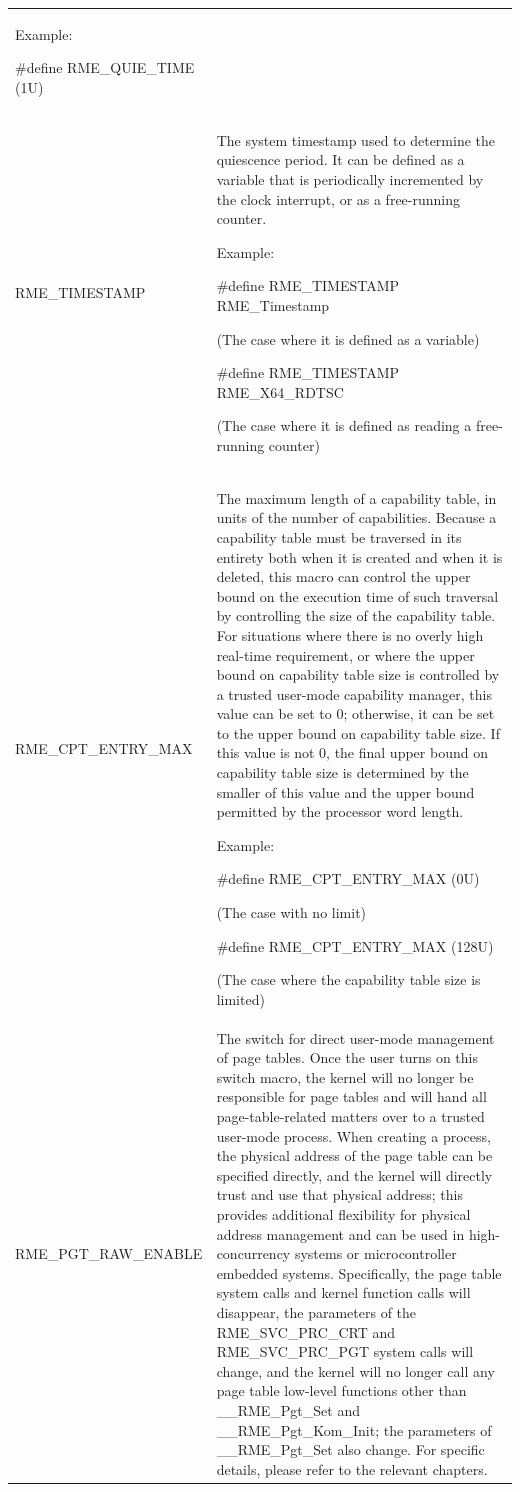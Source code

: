 \begin{xltabular}{\textwidth}{@{}>{\hsize\raggedright\arraybackslash}X>{\hsize\raggedright\arraybackslash}X@{}}
Example:

\#define RME\_QUIE\_TIME (1U)\strut
\tabularnewline
RME\_TIMESTAMP\strut
 & The system timestamp used to determine the quiescence period. It can be defined as a variable that is periodically incremented by the clock interrupt, or as a free-running counter.

Example:

\#define RME\_TIMESTAMP RME\_Timestamp

(The case where it is defined as a variable)

\#define RME\_TIMESTAMP RME\_X64\_RDTSC

(The case where it is defined as reading a free-running counter)\strut
\tabularnewline
RME\_CPT\_ENTRY\_MAX\strut
 & The maximum length of a capability table, in units of the number of capabilities. Because a capability table must be traversed in its entirety both when it is created and when it is deleted, this macro can control the upper bound on the execution time of such traversal by controlling the size of the capability table. For situations where there is no overly high real-time requirement, or where the upper bound on capability table size is controlled by a trusted user-mode capability manager, this value can be set to 0; otherwise, it can be set to the upper bound on capability table size. If this value is not 0, the final upper bound on capability table size is determined by the smaller of this value and the upper bound permitted by the processor word length.

Example:

\#define RME\_CPT\_ENTRY\_MAX (0U)

(The case with no limit)

\#define RME\_CPT\_ENTRY\_MAX (128U)

(The case where the capability table size is limited)\strut
\tabularnewline
RME\_PGT\_RAW\_ENABLE\strut
 & The switch for direct user-mode management of page tables. Once the user turns on this switch macro, the kernel will no longer be responsible for page tables and will hand all page-table-related matters over to a trusted user-mode process. When creating a process, the physical address of the page table can be specified directly, and the kernel will directly trust and use that physical address; this provides additional flexibility for physical address management and can be used in high-concurrency systems or microcontroller embedded systems. Specifically, the page table system calls and kernel function calls will disappear, the parameters of the RME\_SVC\_PRC\_CRT and RME\_SVC\_PRC\_PGT system calls will change, and the kernel will no longer call any page table low-level functions other than \_\_RME\_Pgt\_Set and \_\_RME\_Pgt\_Kom\_Init; the parameters of \_\_RME\_Pgt\_Set also change. For specific details, please refer to the relevant chapters.


\end{xltabular}

